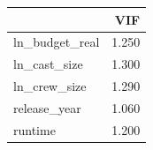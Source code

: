 \begin{tabular}{lr}
\toprule
 & VIF \\
\midrule
ln\_budget\_real & 1.250 \\
ln\_cast\_size & 1.300 \\
ln\_crew\_size & 1.290 \\
release\_year & 1.060 \\
runtime & 1.200 \\
\bottomrule
\end{tabular}